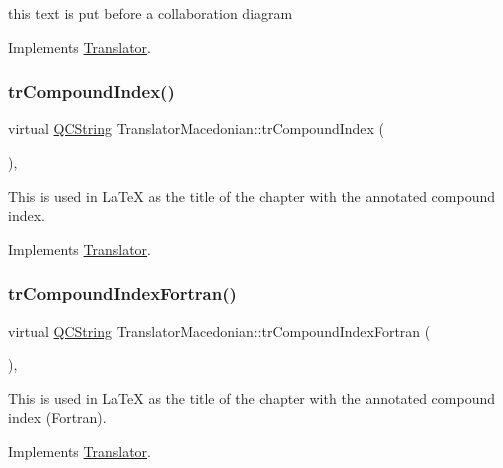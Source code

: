 this text is put before a collaboration diagram 

Implements \mbox{\hyperlink{class_translator}{Translator}}.

\mbox{\label{class_translator_macedonian_a4d8ada0547f663b494d5bcd89f0903da}} 
\subsubsection{\texorpdfstring{trCompoundIndex()}{trCompoundIndex()}}
{\footnotesize\ttfamily virtual \mbox{\hyperlink{class_q_c_string}{Q\+C\+String}} Translator\+Macedonian\+::tr\+Compound\+Index (\begin{DoxyParamCaption}{ }\end{DoxyParamCaption})\hspace{0.3cm}{\ttfamily [inline]}, {\ttfamily [virtual]}}

This is used in La\+TeX as the title of the chapter with the annotated compound index. 

Implements \mbox{\hyperlink{class_translator}{Translator}}.

\mbox{\label{class_translator_macedonian_a332ca0f326cf962e09d5cc1a9ef407a8}} 
\subsubsection{\texorpdfstring{trCompoundIndexFortran()}{trCompoundIndexFortran()}}
{\footnotesize\ttfamily virtual \mbox{\hyperlink{class_q_c_string}{Q\+C\+String}} Translator\+Macedonian\+::tr\+Compound\+Index\+Fortran (\begin{DoxyParamCaption}{ }\end{DoxyParamCaption})\hspace{0.3cm}{\ttfamily [inline]}, {\ttfamily [virtual]}}

This is used in La\+TeX as the title of the chapter with the annotated compound index (Fortran). 

Implements \mbox{\hyperlink{class_translator}{Translator}}.

